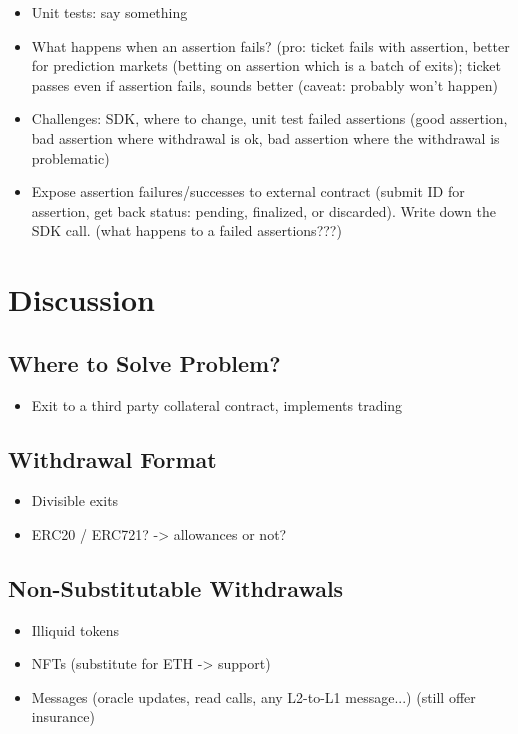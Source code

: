 \begin{itemize}
\item Unit tests: say something
\item What happens when an assertion fails? (pro: ticket fails with assertion, better for prediction markets (betting on assertion which is a batch of exits); ticket passes even if assertion fails, sounds better (caveat: probably won't happen)
\item Challenges: SDK, where to change, unit test failed assertions (good assertion, bad assertion where withdrawal is ok, bad assertion where the withdrawal is problematic)
\item Expose assertion failures/successes to external contract (submit ID for assertion, get back status: pending, finalized, or discarded). Write down the SDK call. (what happens to a failed assertions???)
\end{itemize}



\section{Discussion}

\subsection{Where to Solve Problem? }
\begin{itemize}
\item Exit to a third party collateral contract, implements trading
\end{itemize}

\subsection{Withdrawal Format }
\begin{itemize}
\item Divisible exits
\item ERC20 / ERC721? -> allowances or not? 
\end{itemize}

\subsection{Non-Substitutable Withdrawals}

\begin{itemize}
\item Illiquid tokens 
\item NFTs (substitute for ETH -> support)
\item Messages (oracle updates, read calls, any L2-to-L1 message...) (still offer insurance)
\end{itemize}

